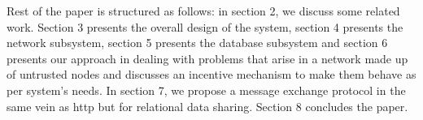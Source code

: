 \documentclass[preprint,10pt]{elsarticle}
\theoremstyle{definition}
\begin{document}
Rest of the paper is structured as follows: in section 2, we discuss some related work. Section 3 presents the overall design of the system, section 4 presents the network subsystem, section 5 presents the database subsystem and section 6 presents our approach in dealing with problems that arise in a network made up of untrusted nodes and discusses an incentive mechanism to make them behave as per system's needs. In section 7, we propose a message exchange protocol in the same vein as http but for relational data sharing. Section 8 concludes the paper.











\end{document}
